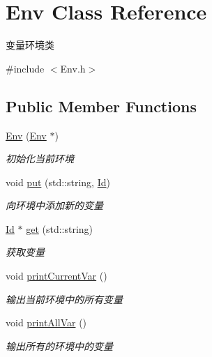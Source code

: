\hypertarget{class_env}{}\section{Env Class Reference}
\label{class_env}


变量环境类  




{\ttfamily \#include $<$Env.\+h$>$}

\subsection*{Public Member Functions}
\begin{DoxyCompactItemize}
\item 
\hyperlink{class_env_ab9d20c5b47453e30038f156cc5e25c0f}{Env} (\hyperlink{class_env}{Env} $\ast$)
\begin{DoxyCompactList}\small\item\em 初始化当前环境 \end{DoxyCompactList}\item 
\mbox{\label{class_env_a4648c2b83fea7e757ccb4ab519ffc9a0}} 
void \hyperlink{class_env_a4648c2b83fea7e757ccb4ab519ffc9a0}{put} (std\+::string, \hyperlink{class_id}{Id})
\begin{DoxyCompactList}\small\item\em 向环境中添加新的变量 \end{DoxyCompactList}\item 
\hyperlink{class_id}{Id} $\ast$ \hyperlink{class_env_a59bbdcdb7af396f6fb6cbff2f828e62b}{get} (std\+::string)
\begin{DoxyCompactList}\small\item\em 获取变量 \end{DoxyCompactList}\item 
void \hyperlink{class_env_a398c166330482abb7e38c546bc3974cf}{print\+Current\+Var} ()
\begin{DoxyCompactList}\small\item\em 输出当前环境中的所有变量 \end{DoxyCompactList}\item 
void \hyperlink{class_env_a8ba6704ef2039c2329569efc99f1e087}{print\+All\+Var} ()
\begin{DoxyCompactList}\small\item\em 输出所有的环境中的变量 \end{DoxyCompactList}\end{DoxyCompactItemize}
